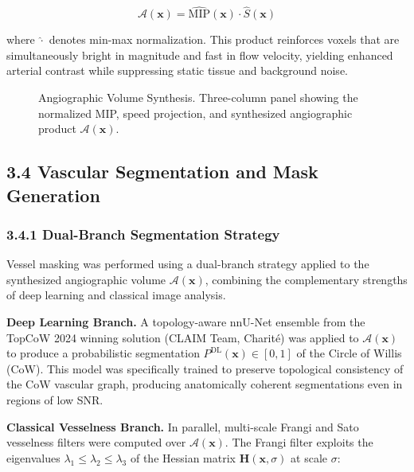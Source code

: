 \documentclass[11pt]{article}
\begin{document}
\begin{equation}
    \mathcal{A}(\mathbf{x}) = \hat{\text{MIP}}(\mathbf{x}) \cdot \hat{S}(\mathbf{x})
\end{equation}

where $\hat{\cdot}$ denotes min-max normalization. This product reinforces voxels that are simultaneously bright in magnitude and fast in flow velocity, yielding enhanced arterial contrast while suppressing static tissue and background noise.

\begin{figure}[!htbp]
    \centering
    \caption{Angiographic Volume Synthesis. Three-column panel showing the normalized MIP, speed projection, and synthesized angiographic product $\mathcal{A}(\mathbf{x})$.}
    \label{fig:angiographic}
\end{figure}

\subsection*{3.4 Vascular Segmentation and Mask Generation}

\subsubsection*{3.4.1 Dual-Branch Segmentation Strategy}

Vessel masking was performed using a dual-branch strategy applied to the synthesized angiographic volume $\mathcal{A}(\mathbf{x})$, combining the complementary strengths of deep learning and classical image analysis.

\textbf{Deep Learning Branch.} A topology-aware nnU-Net ensemble from the TopCoW 2024 winning solution (CLAIM Team, Charité) \cite{yang2023topcow,aydin2024topcow} was applied to $\mathcal{A}(\mathbf{x})$ to produce a probabilistic segmentation $P^{\text{DL}}(\mathbf{x}) \in [0,1]$ of the Circle of Willis (CoW). This model was specifically trained to preserve topological consistency of the CoW vascular graph, producing anatomically coherent segmentations even in regions of low SNR.

\textbf{Classical Vesselness Branch.} In parallel, multi-scale Frangi and Sato vesselness filters \cite{frangi1998,sato1998} were computed over $\mathcal{A}(\mathbf{x})$. The Frangi filter exploits the eigenvalues $\lambda_1 \leq \lambda_2 \leq \lambda_3$ of the Hessian matrix $\mathbf{H}(\mathbf{x}, \sigma)$ at scale $\sigma$:
\end{document}
